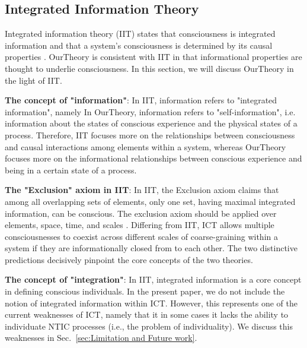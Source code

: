 \documentclass[utf8]{article}
\begin{document}
        
		\subsection{Integrated Information Theory}
            Integrated information theory (IIT) states that consciousness is integrated information and that a system’s consciousness is determined by its causal properties \citep{tononi2016integrated}. \ac{OurTheory} is consistent with IIT in that informational properties are thought to underlie consciousness. In this section, we will discuss \ac{OurTheory} in the light of IIT.            
            
            \textbf{The concept of "information"}: In IIT, information refers to "integrated information", namely  In \ac{OurTheory}, information refers to "self-information", i.e. information about the states of conscious experience and the physical states of a process. Therefore, IIT focuses more on the relationships between consciousness and causal interactions among elements within a system, whereas \ac{OurTheory} focuses more on the informational relationships between conscious experience and being in a certain state of a process. 
		    
		    \textbf{The "Exclusion" axiom in IIT}: In IIT, the Exclusion axiom claims that among all overlapping sets of elements, only one set, having maximal integrated information, can be conscious. The exclusion axiom should be applied over elements, space, time, and scales \citep{oizumi2014phenomenology, hoel2016can}.  Differing from IIT, ICT allows multiple consciousnesses to coexist across different scales of coarse-graining within a system if they are informationally closed from to each other. The two distinctive predictions decisively pinpoint the core concepts of the two theories. 

		    \textbf{The concept of "integration"}: In IIT, integrated information is a core concept in defining conscious individuals. In the present paper, we do not include the notion of integrated information within ICT. However, this represents one of the current weaknesses of ICT, namely that it in some cases it lacks the ability to individuate NTIC processes (i.e., the problem of individuality). We discuss this weaknesses in Sec.~\ref{sec:Limitation and Future work}.
\end{document}
